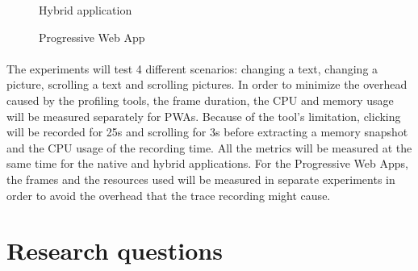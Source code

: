 \documentclass{kththesis}
\begin{document}
\begin{figure}
    \centering
    \hfill
    \hfill
    \hfill
    \hfill
    \caption{Hybrid application}
    \label{fig:hybrid_screens}
\end{figure}

\begin{figure}
    \centering
    \hfill
    \hfill
    \hfill
    \hfill
    \caption{Progressive Web App}
    \label{fig:pwa_screens}
\end{figure}

\paragraph{}
The experiments will test 4 different scenarios: changing a text, changing a picture, scrolling a text and scrolling pictures. In order to minimize the overhead caused by the profiling tools, the frame duration, the CPU and memory usage will be measured separately for PWAs.  \newline
Because of the tool's limitation, clicking will be recorded for 25s and scrolling for 3s before extracting a memory snapshot and the CPU usage of the recording time. All the metrics will be measured at the same time for the native and hybrid applications. For the Progressive Web Apps, the frames and the resources used will be measured in separate experiments in order to avoid the overhead that the trace recording might cause.


\section{Research questions}
\end{document}
